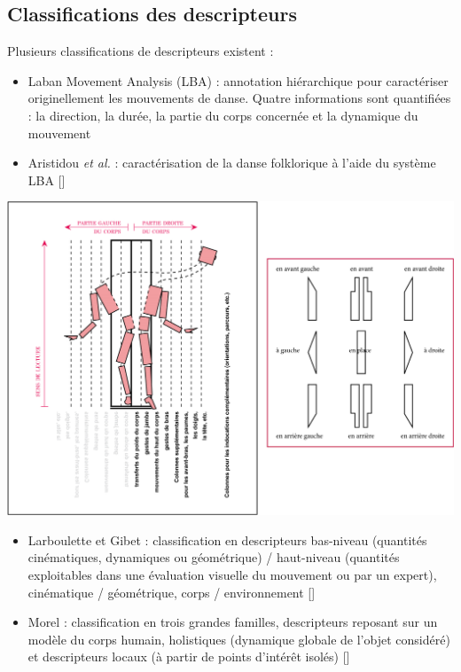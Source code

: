 \documentclass[svgnames]{beamer}
\newcommand{\mycite}[1]{[\textit{\cite{#1}}]}
\begin{document}
	\subsection{Classifications des descripteurs}
	\begin{frame}{\subsecname}
		Plusieurs classifications de descripteurs existent :
		\begin{itemize}[label=$\bullet$]
			\item Laban Movement Analysis (LBA) :  annotation hiérarchique pour caractériser originellement les mouvements de danse. Quatre informations sont quantifiées : la direction, la durée, la partie du corps concernée et la dynamique du mouvement
			\item Aristidou \textit{et al.} : caractérisation de la danse folklorique à l'aide du système LBA \mycite{Aristidou2015FDE}
		\end{itemize}
		
		\centering
		\includegraphics[scale=0.15]{img/laban_2.png}
	\end{frame}
	
	\begin{frame}{\subsecname}
		\begin{itemize}[label=$\bullet$]
			\item Larboulette et Gibet : classification en descripteurs bas-niveau (quantités cinématiques, dynamiques ou géométrique) / haut-niveau (quantités exploitables dans une évaluation visuelle du mouvement ou par un expert), cinématique / géométrique, corps / environnement \mycite{larboulette2015Descriptors}
			\item Morel : classification en trois grandes familles, descripteurs reposant sur un modèle du corps humain, holistiques (dynamique globale de l'objet considéré) et descripteurs locaux (à partir de points d'intérêt isolés) \mycite{Morel2017Mts}
		\end{itemize}
	\end{frame}
	
\end{document}
